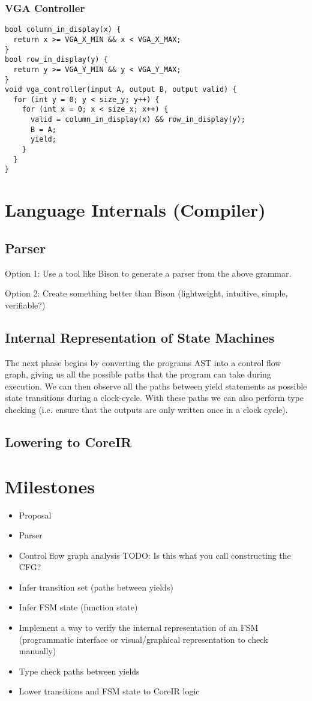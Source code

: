 \documentclass{article}
\newcommand{\TODO}[1]{}
\renewcommand{\TODO}[1]{{\color{red} TODO: {#1}}}
\begin{document}
\subsubsection{VGA Controller}
\begin{verbatim}
bool column_in_display(x) {
  return x >= VGA_X_MIN && x < VGA_X_MAX;
}
bool row_in_display(y) {
  return y >= VGA_Y_MIN && y < VGA_Y_MAX;
}
void vga_controller(input A, output B, output valid) {
  for (int y = 0; y < size_y; y++) {
    for (int x = 0; x < size_x; x++) {
      valid = column_in_display(x) && row_in_display(y);
      B = A;
      yield;
    }
  }
}
\end{verbatim}


\section{Language Internals (Compiler)}
\label{sec:compiler}

\subsection{Parser}
Option 1: Use a tool like Bison to generate a parser from the above grammar. 

Option 2: Create something better than Bison (lightweight, intuitive, simple, verifiable?)

\subsection{Internal Representation of State Machines}
The next phase begins by converting the programs AST into a control flow graph,
giving us all the possible paths that the program can take during execution.
We can then observe all the paths between yield statements as possible state
transitions during a clock-cycle. With these paths we can also perform type
checking (i.e. ensure that the outputs are only written once in a clock cycle).

\subsection{Lowering to CoreIR}

\section{Milestones}
\begin{itemize}
	\item Proposal
	\item Parser
	\item Control flow graph analysis \TODO{Is this what you call constructing the CFG?}
	\item Infer transition set (paths between yields)
	\item Infer FSM state (function state)
	\item Implement a way to verify the internal representation of an FSM (programmatic interface or visual/graphical representation to check manually)
	\item Type check paths between yields
	\item Lower transitions and FSM state to CoreIR logic
\end{itemize}
\end{document}
